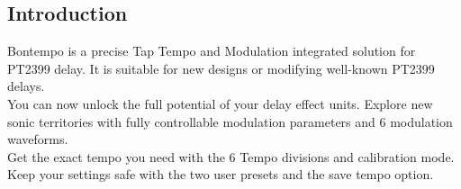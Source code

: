 \documentclass[a4paper, 10pt]{article}
\begin{document}
\begin{multicols}{2}
\section{Introduction}
\bigbreak
Bontempo is a precise Tap Tempo and Modulation integrated solution for PT2399 delay. It is suitable for new designs or modifying well-known PT2399 delays.\\

You can now unlock the full potential of your delay effect units. Explore new sonic territories with fully controllable modulation parameters and 6 modulation waveforms. \\

Get the exact tempo you need with the 6 Tempo divisions and calibration mode.\\

Keep your settings safe with the two user presets and the save tempo option. 
\vfill\null
\columnbreak


\end{multicols}
\end{document}
